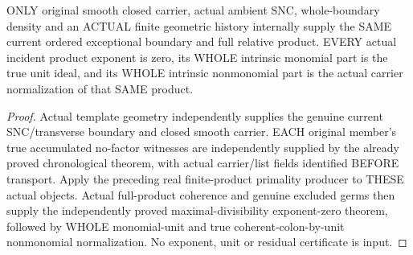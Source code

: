 \begin{theorem}
\label{hir:sharp-original-chronological-full-product-intrinsic-residual-dictionary}
\leanok
ONLY original smooth closed carrier, actual ambient SNC, whole-boundary
density and an ACTUAL finite geometric history internally supply the SAME
current ordered exceptional boundary and full relative product. EVERY actual
incident product exponent is zero, its WHOLE intrinsic monomial part is the
true unit ideal, and its WHOLE intrinsic nonmonomial part is the actual
carrier normalization of that SAME product.
\end{theorem}
\begin{proof}
Actual template geometry independently supplies the genuine current
SNC/transverse boundary and closed smooth carrier. EACH original member's
true accumulated no-factor witnesses are independently supplied by the
already proved chronological theorem, with actual carrier/list fields
identified BEFORE transport. Apply the preceding real finite-product
primality producer to THESE actual objects. Actual full-product coherence
and genuine excluded germs then supply the independently proved
maximal-divisibility exponent-zero theorem, followed by WHOLE monomial-unit
and true coherent-colon-by-unit nonmonomial normalization. No exponent,
unit or residual certificate is input.
\end{proof}

